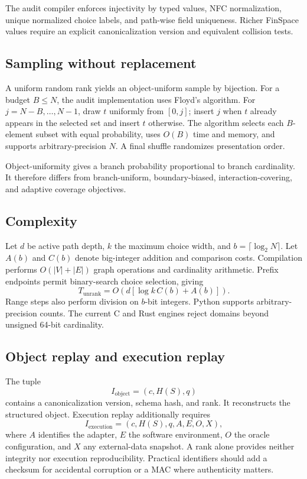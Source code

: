 \documentclass[10pt]{article}
\begin{document}
The audit compiler enforces injectivity by typed values, NFC normalization, unique normalized choice labels, and path-wise field uniqueness. Richer FinSpace values require an explicit canonicalization version and equivalent collision tests.

\subsection{Sampling without replacement}
A uniform random rank yields an object-uniform sample by bijection. For a budget \(B\le N\), the audit implementation uses Floyd's algorithm. For \(j=N-B,\ldots,N-1\), draw \(t\) uniformly from \([0,j]\); insert \(j\) when \(t\) already appears in the selected set and insert \(t\) otherwise. The algorithm selects each \(B\)-element subset with equal probability, uses \(O(B)\) time and memory, and supports arbitrary-precision \(N\). A final shuffle randomizes presentation order.

Object-uniformity gives a branch probability proportional to branch cardinality. It therefore differs from branch-uniform, boundary-biased, interaction-covering, and adaptive coverage objectives.

\subsection{Complexity}
Let \(d\) be active path depth, \(k\) the maximum choice width, and
\(b=\lceil\log_2 N\rceil\). Let \(A(b)\) and \(C(b)\) denote big-integer addition and comparison costs. Compilation performs \(O(|V|+|E|)\) graph operations and cardinality arithmetic. Prefix endpoints permit binary-search choice selection, giving
\begin{equation}
T_{\mathrm{unrank}}=O\left(d[\log k\,C(b)+A(b)]\right).
\end{equation}
Range steps also perform division on \(b\)-bit integers. Python supports arbitrary-precision counts. The current C and Rust engines reject domains beyond unsigned 64-bit cardinality.

\subsection{Object replay and execution replay}
The tuple
\begin{equation}
I_{\mathrm{object}}=(c,H(S),q)
\end{equation}
contains a canonicalization version, schema hash, and rank. It reconstructs the structured object. Execution replay additionally requires
\begin{equation}
I_{\mathrm{execution}}=(c,H(S),q,A,E,O,X),
\end{equation}
where \(A\) identifies the adapter, \(E\) the software environment, \(O\) the oracle configuration, and \(X\) any external-data snapshot. A rank alone provides neither integrity nor execution reproducibility. Practical identifiers should add a checksum for accidental corruption or a MAC where authenticity matters.
\end{document}
